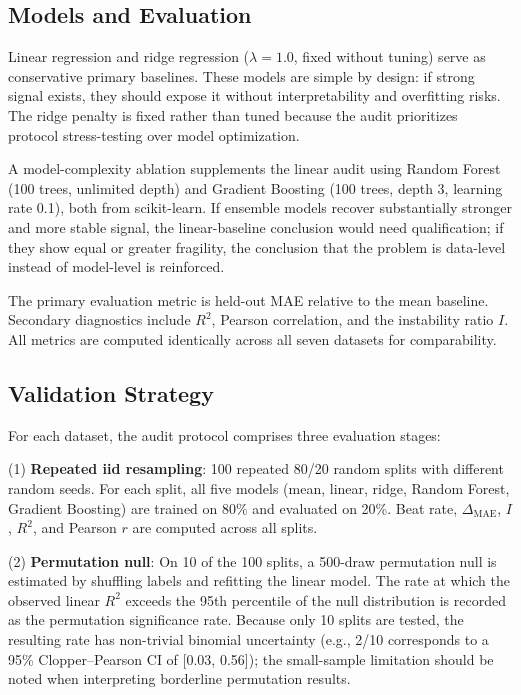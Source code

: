\subsection{Models and Evaluation}
Linear regression and ridge regression ($\lambda = 1.0$, fixed without tuning) serve as conservative primary baselines. These models are simple by design: if strong signal exists, they should expose it without interpretability and overfitting risks. The ridge penalty is fixed rather than tuned because the audit prioritizes protocol stress-testing over model optimization.

A model-complexity ablation supplements the linear audit using Random Forest (100 trees, unlimited depth) and Gradient Boosting (100 trees, depth 3, learning rate 0.1), both from scikit-learn. If ensemble models recover substantially stronger and more stable signal, the linear-baseline conclusion would need qualification; if they show equal or greater fragility, the conclusion that the problem is data-level instead of model-level is reinforced.

The primary evaluation metric is held-out MAE relative to the mean baseline. Secondary diagnostics include $R^2$, Pearson correlation, and the instability ratio $I$. All metrics are computed identically across all seven datasets for comparability.

\subsection{Validation Strategy}
For each dataset, the audit protocol comprises three evaluation stages:

(1) \textbf{Repeated iid resampling}: 100 repeated 80/20 random splits with different random seeds. For each split, all five models (mean, linear, ridge, Random Forest, Gradient Boosting) are trained on 80\% and evaluated on 20\%. Beat rate, $\Delta_{\mathrm{MAE}}$, $I$, $R^2$, and Pearson $r$ are computed across all splits.

(2) \textbf{Permutation null}: On 10 of the 100 splits, a 500-draw permutation null is estimated by shuffling labels and refitting the linear model. The rate at which the observed linear $R^2$ exceeds the 95th percentile of the null distribution is recorded as the permutation significance rate. Because only 10 splits are tested, the resulting rate has non-trivial binomial uncertainty (e.g., 2/10 corresponds to a 95\% Clopper--Pearson CI of [0.03, 0.56]); the small-sample limitation should be noted when interpreting borderline permutation results.

